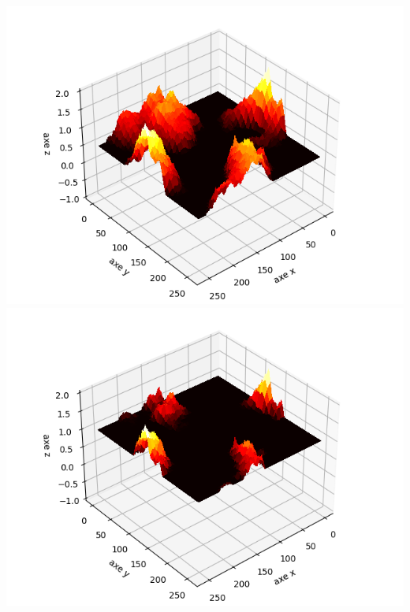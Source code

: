\documentclass[11pt,class=report,crop=false]{standalone}
\begin{document}
\begin{exemple}
\begin{center}
\includegraphics[scale=\myscale,scale=0.4]{figures/diamant-carre-03-3}
\includegraphics[scale=\myscale,scale=0.4]{figures/diamant-carre-03-4}
\end{center}

\end{exemple}
\end{document}
